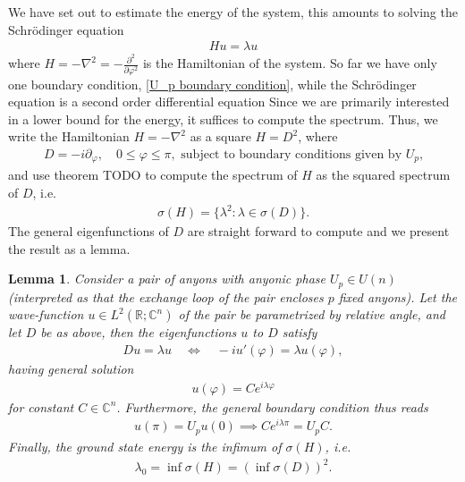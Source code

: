 \documentclass[a4paper,10pt,oneside]{book}
\theoremstyle{plain}
\newtheorem{lemma}[theorem]{Lemma}
\theoremstyle{definition}
\theoremstyle{remark}
\begin{document}
{We have set out to estimate the energy of the system, this amounts to solving the Schrödinger equation
\begin{align*}
  H u = \lambda u
\end{align*}
where $H = -\nabla^2 = -\frac{\partial^2}{\partial\varphi^2}$ is the Hamiltonian of the system.
So far we have only one boundary condition, \cref{U_p boundary condition}, while the Schrödinger equation is a second order differential equation
Since we are primarily interested in a lower bound for the energy, it suffices to compute the spectrum. Thus, we write the Hamiltonian $H = -\nabla^2$ as a square $H = D^2$, where
\begin{align*}
  D = -i\partial_\varphi, \quad 0 \le \varphi \le \pi, \text{ subject to boundary conditions given by $U_p$,}
\end{align*}
and use theorem TODO to compute the spectrum of $H$ as the squared spectrum of $D$, i.e.
\begin{align*}
  \sigma(H) = \{\lambda^2 : \lambda \in \sigma(D)\}.
\end{align*}
The general eigenfunctions of $D$ are straight forward to compute and we present the result as a lemma.

\begin{lemma}\label{D eigenstates spectrum}
  Consider a pair of anyons with anyonic phase $U_p \in U(n)$ (interpreted as that the exchange loop of the pair encloses $p$ fixed anyons).
  Let the wave-function $u \in L^2(\mathbb{R}; \mathbb{C}^n)$ of the pair be parametrized by relative angle, and let $D$ be as above, then the eigenfunctions $u$ to $D$ satisfy
  \begin{align*}
    D u = \lambda u \quad \iff \quad -iu'(\varphi) = \lambda u(\varphi),
  \end{align*}
  having general solution
  \begin{align*}
    u(\varphi) = C e^{i\lambda\varphi}
  \end{align*}
  for constant $C \in \mathbb{C}^n$.
  Furthermore, the general boundary condition thus reads
  \begin{align*}
    u(\pi) = U_p u(0) \implies
    C e^{i\lambda\pi} = U_p C.
  \end{align*}
  Finally, the ground state energy is the infimum of $\sigma(H)$, i.e.
  \begin{align*}
    \lambda_0 = \inf \sigma(H) = \left(\inf\sigma(D)\right)^2.
  \end{align*}
\end{lemma}











}
\end{document}
